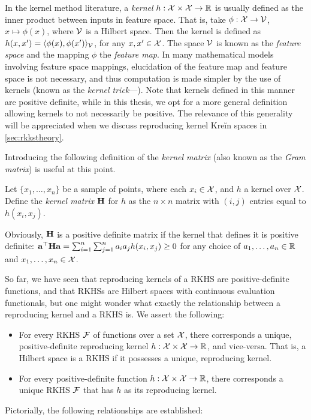 \begin{remark}
  In the kernel method literature, a \emph{kernel} $h:{\mathcal X}\times{\mathcal X}\to\mathbb{R}$ is usually defined as the inner product between inputs in feature space.
  That is, take $\phi:{\mathcal X}\to{\mathcal V}$, $x\mapsto\phi(x)$, where ${\mathcal V}$ is a Hilbert space.
  Then the kernel is defined as $h(x,x') = \langle\phi(x),\phi(x')\rangle_{\mathcal V}$, for any $x,x'\in{\mathcal X}$.
  The space ${\mathcal V}$ is known as the \emph{feature space} and the mapping $\phi$ the \emph{feature map}.
  In many mathematical models involving feature space mappings, elucidation of the feature map and feature space is not necessary, and thus computation  is made simpler by the use of kernels (known as the \emph{kernel trick}---\cite{hofmann2008kernel}).
  Note that kernels defined in this manner are positive definite, while in this thesis, we opt for a more general definition allowing kernels to not necessarily be positive.
  The relevance of this generality will be appreciated when we discuss reproducing kernel Kreĭn spaces in \cref{sec:rkkstheory}.
\end{remark}

\vspace{-0.8em}
Introducing the following definition of the \emph{kernel matrix} (also known as the \emph{Gram matrix}) is useful at this point.
\begin{definition}
  Let $\{x_1,\dots,x_n\}$ be a sample of points, where each $x_i\in{\mathcal X}$, and $h$ a kernel over ${\mathcal X}$.
  Define the \emph{kernel matrix} ${\mathbf H}$ for $h$ as the $n \times n$ matrix with $(i,j)$ entries equal to $h(x_i,x_j)$.
\end{definition}
Obviously, ${\mathbf H}$ is a positive definite matrix if the kernel that defines it is positive definite: ${\mathbf a}^\top{\mathbf H}{\mathbf a} = \sum_{i=1}^n\sum_{j=1}^n a_ia_jh(x_i,x_j) \geq 0$ for any choice of $a_1,\dots,a_n\in\mathbb{R}$ and $x_1,\dots,x_n\in{\mathcal X}$.

So far, we have seen that reproducing kernels of a RKHS are positive-definite functions, and that RKHSs are Hilbert spaces with continuous evaluation functionals, but one might wonder what exactly the relationship between a reproducing kernel and a RKHS is.
We assert the following:
\begin{itemize}
  \item For every RKHS ${\mathcal F}$ of functions over a set ${\mathcal X}$, there corresponds a unique, positive-definite reproducing kernel $h:{\mathcal X}\times{\mathcal X}\to\mathbb{R}$, and vice-versa. That is, a Hilbert space is a RKHS if it possesses a unique, reproducing kernel.
  \item For every positive-definite function $h:{\mathcal X}\times{\mathcal X}\to\mathbb{R}$, there corresponds a unique RKHS ${\mathcal F}$ that has $h$ as its reproducing kernel.
\end{itemize}
Pictorially, the following relationships are established:


